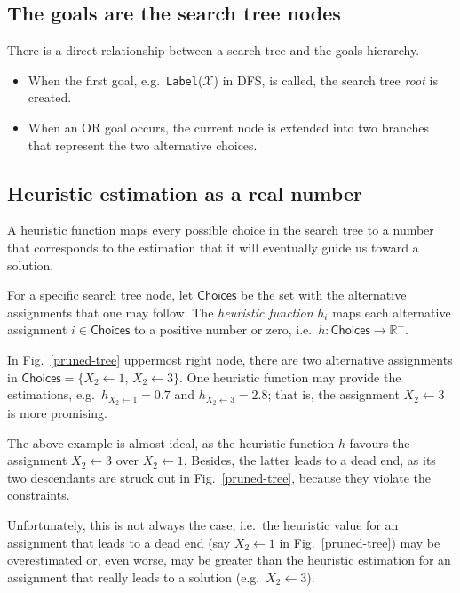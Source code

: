 \documentclass{ws-ijait}
\begin{document}
\subsection{The goals are the search tree nodes}

There is a direct relationship between a search tree and the
goals hierarchy.
\begin{itemize}
  \item When the first goal, e.g.\ 
        \texttt{Label}($\mathscr{X}$) in DFS, is called, the
        search tree \emph{root} is created.
  \item When an \textsf{OR} goal occurs, the current node is
        extended into two branches that represent the two
        alternative choices.
\end{itemize}

\subsection{Heuristic estimation as a real number}

A heuristic function maps every possible choice in the
search tree to a number that corresponds to the estimation
that it will eventually guide us toward a solution.
\begin{definition}
  For a specific search tree node, let $\mathsf{Choices}$ be
  the set with the alternative assignments that one may
  follow. The \emph{heuristic function} $h_i$ maps each
  alternative assignment $i \in \mathsf{Choices}$ to a
  positive number or zero, i.e.\ $h: \mathsf{Choices} \to
  \mathbb{R}^+$.
\end{definition}
\begin{example}
  In Fig.~\ref{pruned-tree} uppermost right node, there are
  two alternative assignments in $\mathsf{Choices} = \{ X_2
  \gets 1, \, X_2 \gets 3 \}$. One heuristic function may
  provide the estimations, e.g.\ $h_{X_2 \gets 1} = 0.7$ and
  $h_{X_2 \gets 3} = 2.8$; that is, the assignment $X_2
  \gets 3$ is more promising.
\end{example}
The above example is almost ideal, as the heuristic function
$h$ favours the assignment $X_2 \gets 3$ over $X_2 \gets 1$.
Besides, the latter leads to a dead end, as its two
descendants are struck out in Fig.~\ref{pruned-tree},
because they violate the constraints.

Unfortunately, this is not always the case, i.e.\ the
heuristic value for an assignment that leads to a dead end
(say $X_2 \gets 1$ in Fig.~\ref{pruned-tree}) may be
overestimated or, even worse, may be greater than the
heuristic estimation for an assignment that really leads to
a solution (e.g.\ $X_2 \gets 3$).
\end{document}
